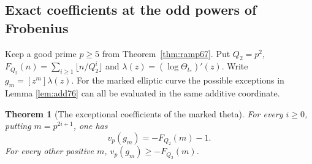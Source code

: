 \documentclass[a4paper,11pt]{article}
\newtheorem{theorem}[proposition]{Theorem}
\theoremstyle{definition}
\theoremstyle{remark}
\numberwithin{equation}{section}
\begin{document}
\subsection{Exact coefficients at the odd powers of Frobenius}\label{nav:V-26}
Keep a good prime \(p\ge5\) from Theorem~\ref{thm:ramp67}.
Put \(Q_2=p^2\), \(F_{Q_2}(n)=\sum_{i\ge1}\lfloor n/Q_2^i\rfloor\)
and \(\lambda(z)=(\log\Theta_{t_*})'(z)\). Write
\(g_m=[z^m]\lambda(z)\). For the marked elliptic curve the
possible exceptions in
Lemma \ref{lem:add76}
can all be evaluated in the same additive coordinate.

\begin{theorem}[The exceptional coefficients of the marked theta]
\label{thm:sharp78}
For every \(i\ge0\), putting \(m=p^{2i+1}\), one has
\[
                 v_p(g_m)=-F_{Q_2}(m)-1.
\]
For every other positive \(m\), \(v_p(g_m)\ge-F_{Q_2}(m)\).
\end{theorem}
\end{document}
